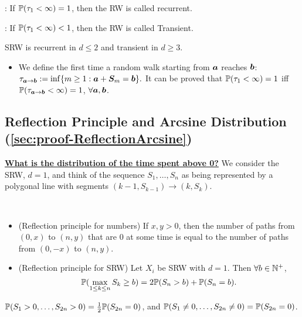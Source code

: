 \documentclass[10pt,a4paper]{article}
\begin{document}
\noindent {}: If $\mathbb P (\tau_1<\infty )=1$, then the RW is called recurrent.

\noindent {}: If $\mathbb P (\tau_1<\infty )<1$, then the RW is called Transient.


\begin{thmbox}
	\begin{theorem}\label{thm:RecSRW}
		SRW is recurrent in $d\leq 2$ and transient in $d\geq 3$.   
	\end{theorem}
\end{thmbox}
\begin{itemize}
	\item We define the first time a random walk starting from ${\boldsymbol a}$ reaches ${\boldsymbol b}$: $\tau_{{\boldsymbol a}\to {\boldsymbol b}}:=\inf\{m\geq1:{\boldsymbol a}+{\boldsymbol S}_m={\boldsymbol b}\}.$ It can be proved that $\mathbb P(\tau_1<\infty )=1$ iff $\mathbb P(\tau_{{\boldsymbol a}\to {\boldsymbol b}}<\infty )=1$, $\forall {\boldsymbol a},{\boldsymbol b}$.   
\end{itemize}


\subsection{Reflection Principle and Arcsine Distribution (\ref{sec:proof-ReflectionArcsine})}\label{sec:ReflectionArcsine}
\noindent \underline{\textbf{What is the distribution of the time spent above 0?}} We consider the SRW, $d=1$, and think of the sequence $S_1,\ldots,S_n$ as being represented by a polygonal line with segments $(k-1,S_{k-1})\rightarrow (k,S_k)$.  
\begin{thmbox}
	\begin{theorem}\label{thm:ReflectionPrin}
		\
		\begin{itemize}
			\item (Reflection principle for numbers) If $x,y>0$, then the number of paths from $(0,x)$ to $(n,y)$ that are 0 at some time is equal to the number of paths from $(0,-x)$ to $(n,y)$.    
			\item (Reflection principle for SRW) 
			Let $X_i$ be SRW with $d=1$. Then $\forall b\in\mathbb N^+$, 
			\begin{equation*}
				\mathbb P(\max_{1\leq k\leq n} S_k\geq b)=2\mathbb P(S_n>b) + \mathbb P(S_n=b).
			\end{equation*}  
		\end{itemize}
	\end{theorem}
		
	\begin{theorem}\label{thm:ReflectionHit0} $\mathbb P(S_1> 0,\ldots,S_{2n}> 0)=\frac12\mathbb P(S_{2n}=0)$, and
		$\mathbb P(S_1\neq 0,\ldots,S_{2n}\neq 0)=\mathbb P(S_{2n}=0)$. 
	\end{theorem}
\end{thmbox}
\end{document}
